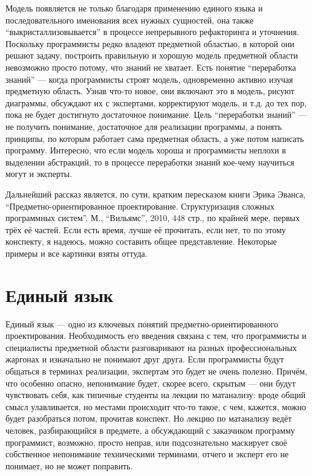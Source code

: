 \documentclass[a5paper]{article}
\begin{document}
Модель появляется не только благодаря применению единого языка и последовательного именования всех нужных сущностей, она также ``выкристаллизовывается'' в процессе непрерывного рефакторинга и уточнения. Поскольку программисты редко владеют предметной областью, в которой они решают задачу, построить правильную и хорошую модель предметной области невозможно просто потому, что знаний не хватает. Есть понятие ``переработка знаний'' --- когда программисты строят модель, одновременно активно изучая предметную область. Узнав что-то новое, они включают это в модель, рисуют диаграммы, обсуждают их с экспертами, корректируют модель, и т.д. до тех пор, пока не будет достигнуто достаточное понимание. Цель ``переработки знаний'' --- не получить понимание, достаточное для реализации программы, а понять принципы, по которым работает сама предметная область, а уже потом написать программу. Интересно, что если модель хороша и программисты неплохи в выделении абстракций, то в процессе переработки знаний кое-чему научиться могут и эксперты.

Дальнейший рассказ является, по сути, кратким пересказом книги Эрика Эванса, ``Предметно-ориентированное проектирование. Структуризация сложных программных систем''. М., ``Вильямс'', 2010, 448 стр., по крайней мере, первых трёх её частей. Если есть время, лучше её прочитать, если нет, то по этому конспекту, я надеюсь, можно составить общее представление. Некоторые примеры и все картинки взяты оттуда.

\section{Единый язык}

Единый язык --- одно из ключевых понятий предметно-ориентированного проектирования. Необходимость его введения связана с тем, что программисты и специалисты предметной области разговаривают на разных профессиональных жаргонах и изначально не понимают друг друга. Если программисты будут общаться в терминах реализации, экспертам это будет не очень полезно. Причём, что особенно опасно, непонимание будет, скорее всего, скрытым --- они будут чувствовать себя, как типичные студенты на лекции по матанализу: вроде общий смысл улавливается, но местами происходит что-то такое, с чем, кажется, можно будет разобраться потом, прочитав конспект. Но лекцию по матанализу ведёт человек, разбирающийся в предмете, а обсуждающий с заказчиком программу программист, возможно, просто неправ, или подсознательно маскирует своё собственное непонимание техническими терминами, отчего и эксперт его не понимает, но не может поправить.
\end{document}
